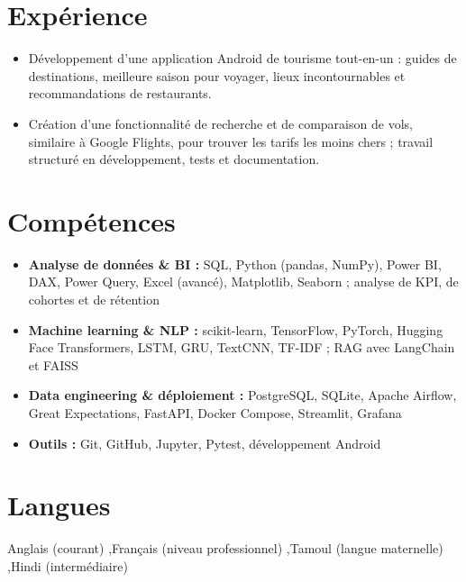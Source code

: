 \section{Expérience}
\begin{itemize}
  \item Développement d'une application Android de tourisme tout-en-un : guides de destinations, meilleure saison pour voyager, lieux incontournables et recommandations de restaurants.
  \item Création d'une fonctionnalité de recherche et de comparaison de vols, similaire à Google Flights, pour trouver les tarifs les moins chers ; travail structuré en développement, tests et documentation.
\end{itemize}

\section{Compétences}
\begin{itemize}
  \item \textbf{Analyse de données \& BI :} SQL, Python (pandas, NumPy), Power BI, DAX, Power Query, Excel (avancé), Matplotlib, Seaborn ; analyse de KPI, de cohortes et de rétention
  \item \textbf{Machine learning \& NLP :} scikit-learn, TensorFlow, PyTorch, Hugging Face Transformers, LSTM, GRU, TextCNN, TF-IDF ; RAG avec LangChain et FAISS
  \item \textbf{Data engineering \& déploiement :} PostgreSQL, SQLite, Apache Airflow, Great Expectations, FastAPI, Docker Compose, Streamlit, Grafana
  \item \textbf{Outils :} Git, GitHub, Jupyter, Pytest, développement Android
\end{itemize}

\section{Langues}
Anglais (courant) \sep Français (niveau professionnel) \sep Tamoul (langue maternelle) \sep Hindi (intermédiaire)


